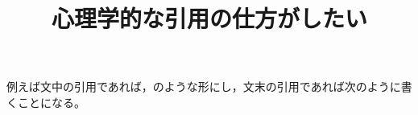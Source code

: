 \documentclass[uplatex,a4paper,11pt]{jsarticle}
\begin{document}
\title{心理学的な引用の仕方がしたい}

例えば文中の引用であれば，\citet{越智2013}のような形にし，文末の引用であれば次のように書くことになる\citep{Blechman1990}。



\nocite{*}
\end{document}
